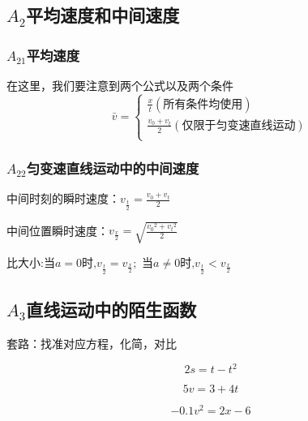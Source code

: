 \documentclass[lang=cn,10pt]{elegantbook}
\begin{document}
	\subsection{$A_{2}$平均速度和中间速度}
	\subsubsection{$A_{21}$平均速度}
	在这里，我们要注意到两个公式以及两个条件
	\begin{equation*}
		\bar{v}=\begin{cases}
			\frac{x}{t}\left( \text{所有条件均使用} \right)\\
			\frac{v_0+v_t}{2}\left( \text{仅限于匀变速直线运动} \right)\\
		\end{cases}
	\end{equation*}
	\subsubsection{$A_{22}$匀变速直线运动中的中间速度}
	中间时刻的瞬时速度：$v_{\frac{t}{2}}=\frac{v_0+v_t}{2} $
	
	中间位置瞬时速度：$v_{\frac{x}{2}}=\sqrt{\frac{{v_0}^2+{v_t}^2}{2}} $
	
	\begin{remark}
		$\text{比大小:当}a=0\text{时,}v_{\frac t2}=v_{\frac x2};\text{ 当}a\neq0\text{时,}v_{\frac t2}<v_{\frac x2}$
	\end{remark}
	\subsection{$A_{3}$直线运动中的陌生函数}
	套路：找准对应方程，化简，对比
	\begin{example}
		\begin{equation*}
			2s=t-t^{2}
		\end{equation*}
	\end{example}
	\vspace{1.3cm}
	\begin{example}
		\begin{equation*}
			5v=3+4t
		\end{equation*}
		\vspace{1.3cm}
	\end{example}
	\begin{example}
		\begin{equation*}
			-0.1v^{2}=2x-6
		\end{equation*}
	\end{example}
	\vspace{1.3cm}
\end{document}
